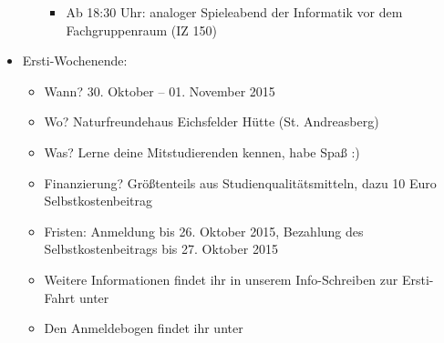 \begin{itemize}
\begin{itemize}
\begin{itemize}
\item Ab 18:30 Uhr: analoger Spieleabend der Informatik vor dem Fachgruppenraum (IZ 150)
\end{itemize}
\end{itemize}
\item Ersti-Wochenende:
\begin{itemize}
\item Wann? 30. Oktober – 01. November 2015
\item Wo? Naturfreundehaus Eichsfelder Hütte (St. Andreasberg)
\item Was? Lerne deine Mitstudierenden kennen, habe Spaß :)
\item Finanzierung? Größtenteils aus Studienqualitätsmitteln, dazu 10 Euro Selbstkostenbeitrag
\item Fristen: Anmeldung bis 26. Oktober 2015, Bezahlung des Selbstkostenbeitrags bis 27. Oktober 2015
\item Weitere Informationen findet ihr in unserem Info-Schreiben zur Ersti-Fahrt unter\\ 
\item Den Anmeldebogen findet ihr unter\\ 
\end{itemize}
\end{itemize}